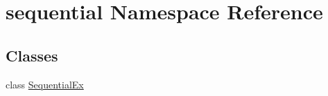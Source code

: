 \hypertarget{namespacesequential}{\section{sequential Namespace Reference}
\label{namespacesequential}
}
\subsection*{Classes}
\begin{DoxyCompactItemize}
\item 
class \hyperlink{classsequential_1_1_sequential_ex}{Sequential\-Ex}
\end{DoxyCompactItemize}
